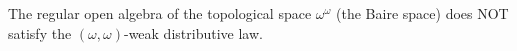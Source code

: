 The regular open algebra of the topological space $\omega^{\omega}$ (the Baire space) does NOT satisfy the $(\omega, \omega)$-weak distributive law.
